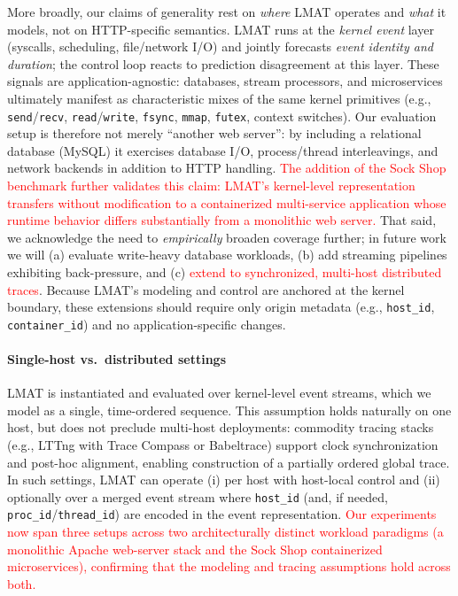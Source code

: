 \documentclass[preprint,12pt]{elsarticle}
\begin{document}
More broadly, our claims of generality rest on \emph{where} LMAT operates and \emph{what} it models, not on HTTP-specific semantics. LMAT runs at the \emph{kernel event} layer (syscalls, scheduling, file/network I/O) and jointly forecasts \emph{event identity and duration}; the control loop reacts to prediction disagreement at this layer. These signals are application-agnostic: databases, stream processors, and microservices ultimately manifest as characteristic mixes of the same kernel primitives (e.g., \texttt{send}/\texttt{recv}, \texttt{read}/\texttt{write}, \texttt{fsync}, \texttt{mmap}, \texttt{futex}, context switches). Our evaluation setup is therefore not merely “another web server”: by including a relational database (MySQL) it exercises database I/O, process/thread interleavings, and network backends in addition to HTTP handling. \textcolor{red}{The addition of the Sock Shop benchmark further validates this claim: LMAT's kernel-level representation transfers without modification to a containerized multi-service application whose runtime behavior differs substantially from a monolithic web server.} That said, we acknowledge the need to \emph{empirically} broaden coverage further; in future work we will (a) evaluate write-heavy database workloads, (b) add streaming pipelines exhibiting back-pressure, and (c) \textcolor{red}{extend to synchronized, multi-host distributed traces}. Because LMAT’s modeling and control are anchored at the kernel boundary, these extensions should require only origin metadata (e.g., \texttt{host\_id}, \texttt{container\_id}) and no application-specific changes.




\paragraph{Single-host vs.\ distributed settings}
LMAT is instantiated and evaluated over kernel-level event streams, which we model as a single, time-ordered sequence. This assumption holds naturally on one host, but does not preclude multi-host deployments: commodity tracing stacks (e.g., LTTng with Trace Compass or Babeltrace) support clock synchronization and post-hoc alignment, enabling construction of a partially ordered global trace. In such settings, LMAT can operate (i) per host with host-local control and (ii) optionally over a merged event stream where \texttt{host\_id} (and, if needed, \texttt{proc\_id}/\texttt{thread\_id}) are encoded in the event representation. \textcolor{red}{Our experiments now span three setups across two architecturally distinct workload paradigms (a monolithic Apache web-server stack and the Sock Shop containerized microservices), confirming that the modeling and tracing assumptions hold across both.}
\end{document}
